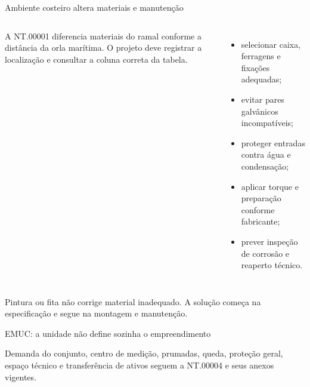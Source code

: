 \begin{frame}{Ambiente costeiro altera materiais e manutenção}
\small
\begin{columns}[T,onlytextwidth]
\begin{caixaNorma}[title=Até e após \SI{2}{km} da orla]
A NT.00001 diferencia materiais do ramal conforme a distância da orla marítima. O projeto deve registrar a localização e consultar a coluna correta da tabela.
\end{caixaNorma}
\begin{itemize}
\item selecionar caixa, ferragens e fixações adequadas;
\item evitar pares galvânicos incompatíveis;
\item proteger entradas contra água e condensação;
\item aplicar torque e preparação conforme fabricante;
\item prever inspeção de corrosão e reaperto técnico.
\end{itemize}
\end{columns}
\begin{caixaAt}
Pintura ou fita não corrige material inadequado. A solução começa na especificação e segue na montagem e manutenção.
\end{caixaAt}
\end{frame}

\begin{frame}{EMUC: a unidade não define sozinha o empreendimento}
\centering
{}
\vspace{2mm}
\begin{caixaNorma}
Demanda do conjunto, centro de medição, prumadas, queda, proteção geral, espaço técnico e transferência de ativos seguem a NT.00004 e seus anexos vigentes.
\end{caixaNorma}
\end{frame}

